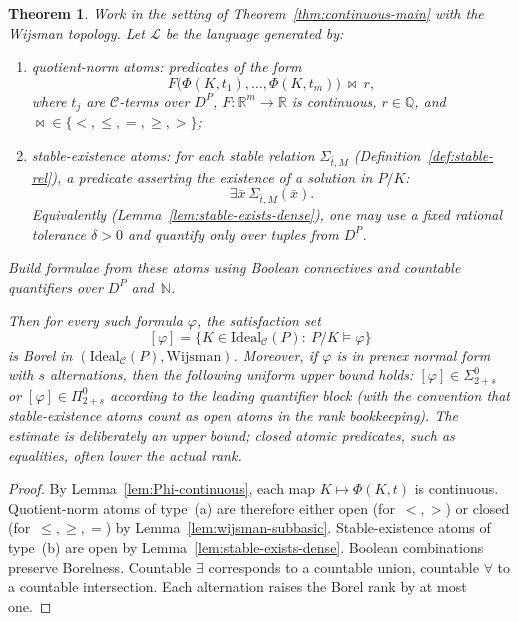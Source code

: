 \documentclass[12pt,fleqn,a4paper]{amsart}
\renewcommand{\le}{\leqslant}
\renewcommand{\ge}{\geqslant}
\numberwithin{equation}{section}
\newtheorem{theorem}{Theorem}[section]
\theoremstyle{definition}
\newcommand{\N}{\mathbb{N}}
\newcommand{\Q}{\mathbb{Q}}
\newcommand{\R}{\mathbb{R}}
\newcommand{\Ideal}{\mathrm{Ideal}}
\begin{document}
\begin{theorem}\label{thm:definability-rank}
Work in the setting of Theorem~\ref{thm:continuous-main} with the Wijsman topology.
Let $\mathcal L$ be the language generated by:

\begin{enumerate}[label=\textup{(\alph*)}]
\item \emph{quotient-norm atoms:}
predicates of the form
\[
F\bigl(\Phi(K,t_1),\dots,\Phi(K,t_m)\bigr)\ \bowtie\ r,
\]
where $t_j$ are $\mathcal C$-terms over $D^P$, $F:\R^m\to\R$ is continuous,
$r\in\Q$, and $\bowtie\in\{<,\le,=,\ge,>\}$;

\item \emph{stable-existence atoms:}
for each stable relation $\Sigma_{\bar t,M}$ (Definition~\ref{def:stable-rel}),
a predicate asserting the existence of a solution in $P/K$:
\[
\exists \bar x\ \Sigma_{\bar t,M}(\bar x).
\]
Equivalently (Lemma~\ref{lem:stable-exists-dense}), one may use a fixed rational
tolerance $\delta>0$ and quantify only over tuples from $D^P$.
\end{enumerate}

Build formulae from these atoms using Boolean connectives and countable quantifiers
over $D^P$ and~$\N$.

Then for every such formula $\varphi$, the satisfaction set
\[
[\varphi]=\{K\in\Ideal_{\mathcal C}(P):\ P/K\models\varphi\}
\]
is Borel in $(\Ideal_{\mathcal C}(P),\mathrm{Wijsman})$.
Moreover, if $\varphi$ is in prenex normal form with $s$ alternations, then the
following uniform upper bound holds:
$[\varphi]\in\Sigma^0_{2+s}$ or $[\varphi]\in\Pi^0_{2+s}$ according to the leading
quantifier block (with the convention that stable-existence atoms count as
\emph{open} atoms in the rank bookkeeping).  The estimate is deliberately an upper
bound; closed atomic predicates, such as equalities, often lower the actual rank.
\end{theorem}

\begin{proof}
By Lemma~\ref{lem:Phi-continuous}, each map $K\mapsto\Phi(K,t)$ is continuous.
Quotient-norm atoms of type~(a) are therefore either open (for~$<,>$) or closed
(for~$\le,\ge,=$) by Lemma~\ref{lem:wijsman-subbasic}.
Stable-existence atoms of type~(b) are open by
Lemma~\ref{lem:stable-exists-dense}.
Boolean combinations preserve Borelness.
Countable $\exists$ corresponds to a countable union, countable $\forall$ to a
countable intersection.  Each alternation raises the Borel rank by at most one.
\end{proof}
\end{document}
